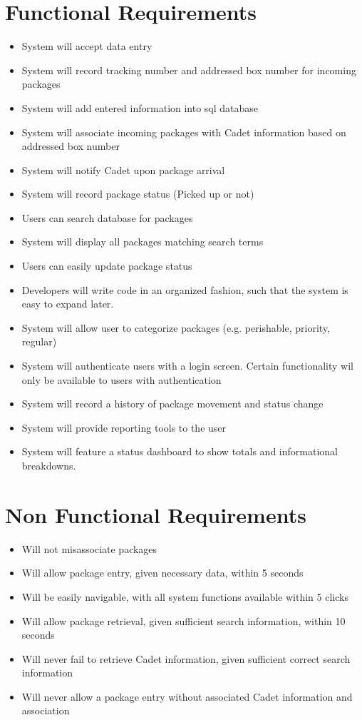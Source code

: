 \documentclass[11pt]{article}
\begin{document}
\section*{Functional Requirements}
\label{sec:orgbbb587b}
\begin{itemize}
\item System will accept data entry
\item System will record tracking number and addressed box number for incoming packages
\item System will add entered information into sql database
\item System will associate incoming packages with Cadet information based on addressed box number
\item System will notify Cadet upon package arrival
\item System will record package status (Picked up or not)
\item Users can search database for packages
\item System will display all packages matching search terms
\item Users can easily update package status
\item Developers will write code in an organized fashion, such that the system is easy to expand later.
\item System will allow user to categorize packages (e.g. perishable, priority, regular)
\item System will authenticate users with a login screen. Certain functionality wil only be available to users with authentication
\item System will record a history of package movement and status change
\item System will provide reporting tools to the user
\item System will feature a status dashboard to show totals and informational breakdowns.
\end{itemize}
\section*{Non Functional Requirements}
\label{sec:orga1c63aa}
\begin{itemize}
\item Will not misassociate packages
\item Will allow package entry, given necessary data, within 5 seconds
\item Will be easily navigable, with all system functions available within 5 clicks
\item Will allow package retrieval, given sufficient search information, within 10 seconds
\item Will never fail to retrieve Cadet information, given sufficient correct search information
\item Will never allow a package entry without associated Cadet information and association
\end{itemize}
\end{document}
